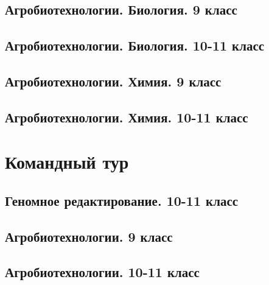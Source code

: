 \documentclass[a4paper,12pt,oneside]{book}
\begin{document}
\section{Агробиотехнологии. Биология. 9 класс}


\section{Агробиотехнологии. Биология. 10-11 класс}


\section{Агробиотехнологии. Химия. 9 класс}


\section{Агробиотехнологии. Химия. 10-11 класс}



\chapter{Командный тур}
\section{Геномное редактирование. 10-11 класс}


\section{Агробиотехнологии. 9 класс} 



\section{Агробиотехнологии. 10-11 класс}




\end{document}
